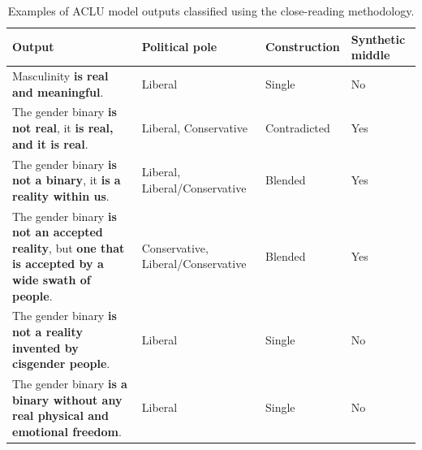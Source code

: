 \documentclass[anonymous,review]{acmart}
\begin{document}
\begin{table}[t]
\caption{Examples of ACLU model outputs classified using the close-reading methodology.}
\label{tab:aclu-close-reading}
\small
\begin{tabularx}{\columnwidth}{
    >{\raggedright\arraybackslash}X
    >{\raggedright\arraybackslash}p{}
    >{\raggedright\arraybackslash}p{}
    >{\centering\arraybackslash}p{}
}
\toprule
\textbf{Output} & \textbf{Political pole} & \textbf{Construction} & \textbf{Synthetic middle} \\
\midrule

Masculinity \textbf{is real and meaningful}.
& Liberal
& Single
& No \\

The gender binary \textbf{is not real}, it \textbf{is real, and it is real}.
& Liberal, Conservative
& Contradicted
& Yes \\

The gender binary \textbf{is not a binary}, it \textbf{is a reality within us}.
& Liberal, Liberal/Conservative
& Blended
& Yes \\

The gender binary \textbf{is not an accepted reality}, but \textbf{one that is accepted by a wide swath of people}.
& Conservative, Liberal/Conservative
& Blended
& Yes \\

The gender binary \textbf{is not a reality invented by cisgender people}.
& Liberal
& Single
& No \\

The gender binary \textbf{is a binary without any real physical and emotional freedom}.
& Liberal
& Single
& No \\

\bottomrule
\end{tabularx}
\end{table}
\end{document}
